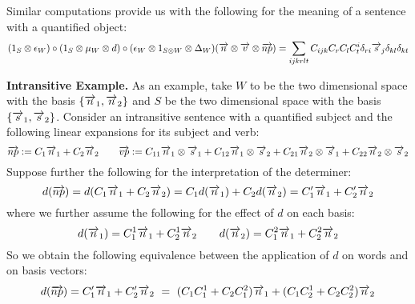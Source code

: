 \noindent
Similar computations provide us with the following for the meaning of a sentence with a quantified object:
\[
(1_S \otimes \epsilon_W) \circ (1_S \otimes \mu_W \otimes d) \circ (\epsilon_W \otimes 1_{S \otimes W} \otimes \Delta_W)(\overrightarrow{{n}} \otimes \overrightarrow{{v}} \otimes \overrightarrow{{np}}) = \sum_{ijkrlt} C_{ijk} C_r C_l C^i_t \delta_{ri} \overrightarrow{s}_j \delta_{kl} \delta_{kt}
\]

\noindent
{\bf Intransitive Example.} 
As an example, take $W$ to be the two dimensional space with the basis $\{\overrightarrow{n}_1, \overrightarrow{n}_2\}$ and $S$ be the two dimensional space with the basis $\{\overrightarrow{s}_1, \overrightarrow{s}_2\}$.  Consider an intransitive sentence with a quantified subject and the following linear expansions for its subject and verb:
\[
\overrightarrow{np} := C_1 \overrightarrow{n}_1 + C_2 \overrightarrow{n}_2
\qquad 
 \overrightarrow{vp} := C_{11} \overrightarrow{n}_1 \otimes \overrightarrow{s}_1 + C_{12} \overrightarrow{n}_1 \otimes \overrightarrow{s}_2 +  C_{21}  \overrightarrow{n}_2 \otimes \overrightarrow{s}_1 + C_{22} \overrightarrow{n}_2 \otimes \overrightarrow{s}_2
 \]
    Suppose further the following for the interpretation of the determiner:
 \begin{equation*}\label{eqDetLin}
d(\overrightarrow{{np}}) = d(C_1 \overrightarrow{n}_1 + C_2 \overrightarrow{n}_2) =  C_1 d(\overrightarrow{n}_1) + C_2 d(\overrightarrow{n}_2) =  C'_1 \overrightarrow{n}_1 + C'_2 \overrightarrow{n}_2
\end{equation*}
where we further assume the following for the effect of $d$ on each basis:
\[
d(\overrightarrow{n}_1) = C^1_1 \overrightarrow{n}_1 + C^1_2 \overrightarrow{n}_2 \qquad
d(\overrightarrow{n}_2) = C^2_1 \overrightarrow{n}_1 + C^2_2 \overrightarrow{n}_2 
\]
So we obtain the following equivalence between the application of $d$ on words and on basis vectors:
\[
d(\overrightarrow{{np}}) = C'_1 \overrightarrow{n}_1 + C'_2 \overrightarrow{n}_2 \ = \ (C_1 C_1^1 + C_2 C_1^2) \overrightarrow{n}_1 + (C_1C_2^1 + C_2C_2^2) \overrightarrow{n}_2
\]

